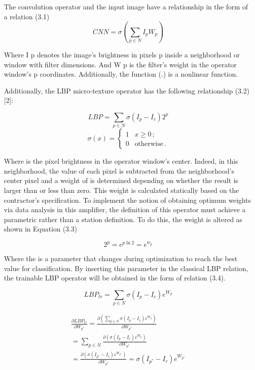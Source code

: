 \documentclass[journal]{IEEEtran}
\begin{document}
The convolution operator and the input image have a relationship in the form of a 
relation (3.1)
\begin{equation}\label{eq:cnn}
	CNN=\sigma(\sum_{p\in N}I_pW_p)
\end{equation}

Where I p denotes the image's brightness in pixels p inside a neighborhood or window with filter dimensions. And W p is the filter's weight in the operator window's p coordinates. Additionally, the function (.) is a nonlinear function.

Additionally, the LBP micro-texture operator has the following relationship (3.2) [2]:

\begin{equation}\label{eq:lbp}
	LBP=\sum_{p\in N}\sigma(I_p-I_c)2^p 
\end{equation}
\[ \sigma(x) = 
\begin{cases} 1  & \text{$x \geq 0 $}\,; \\
	0  & \text{otherwise}\,.
\end{cases} \]

Where  is the pixel brightness in the operator window's center. Indeed, in this neighborhood, the value of each pixel is subtracted from the neighborhood's center pixel and a weight of is determined depending on whether the result is larger than or less than zero. This weight is calculated statically based on the contractor's specification.
To implement the notion of obtaining optimum weights via data analysis in this amplifier, the definition of this operator must achieve a parametric rather than a station definition. To do this, the weight  is altered as shown in Equation (3.3)


\begin{equation}\label{eq:expon}
	2^p=e^{p\ln{2}}=e^{w_p}
\end{equation}

Where the  is a parameter that changes during optimization to reach the best value for classification. By inserting this parameter in the classical LBP relation, the trainable LBP operator will be obtained in the form of relation (3.4).


\begin{equation}\label{eq:lbptr}
	LBP_{tr}=\sum_{p\in N}\sigma(I_p-I_c)e^{W_p} 
\end{equation}


\begin{multline}\label{eq:lbptrdif}
	\frac{\partial LBP_{tr}}{\partial W_{p^*}} 
	= \frac{\partial (\sum_{p\in N}\sigma(I_p-I_c)e^{W_p}) }{\partial W_{p^*}} 
	\\= \sum_{p\in N} {\frac{\partial (\sigma(I_p-I_c)e^{W_p}) }{\partial W_{p^*}} }
	\\= 	\frac{\partial (\sigma(I_{p^*}-I_c)e^{W_{p^*}})}{\partial W_{p^*}}
	= \sigma(I_{p^*}-I_c)e^{W_{p^*}}
	\nonumber
\end{multline}
\end{document}
